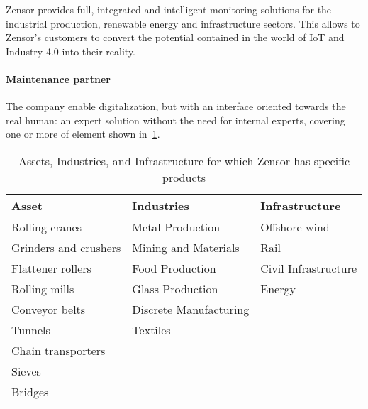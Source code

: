 Zensor \cite{Misc:zensor_official_website} provides full, integrated and intelligent monitoring solutions for the industrial production, renewable energy and infrastructure sectors.
This allows to Zensor's customers to convert the potential contained in the world of \ac{IoT} and Industry 4.0 into their reality. 

\paragraph{Maintenance partner}
The company enable digitalization, but with an interface oriented towards the real human: an expert solution without the need for internal experts, covering one or more of element shown in~\ref{tab:assets_zensors}.
\begin{table}[h]
    \begin{tabularx}{\textwidth}{l l l}
    \toprule
    Asset                 & Industries                       & Infrastructure                       \\ \midrule
    Rolling cranes        & Metal Production                 & Offshore wind                        \\
    Grinders and crushers & Mining and Materials             & Rail                                 \\
    Flattener rollers     & Food Production                  & Civil Infrastructure                 \\
    Rolling mills         & Glass Production                 & Energy                               \\
    Conveyor belts        & Discrete Manufacturing                                                  \\
    Tunnels               & Textiles                                                                \\
    Chain transporters    &                                                                         \\
    Sieves                &                                                                         \\
    Bridges               &                                                                         \\ \bottomrule
    \end{tabularx}
    \caption{Assets, Industries, and Infrastructure for which Zensor has specific products}
    \label{tab:assets_zensors}
\end{table}

